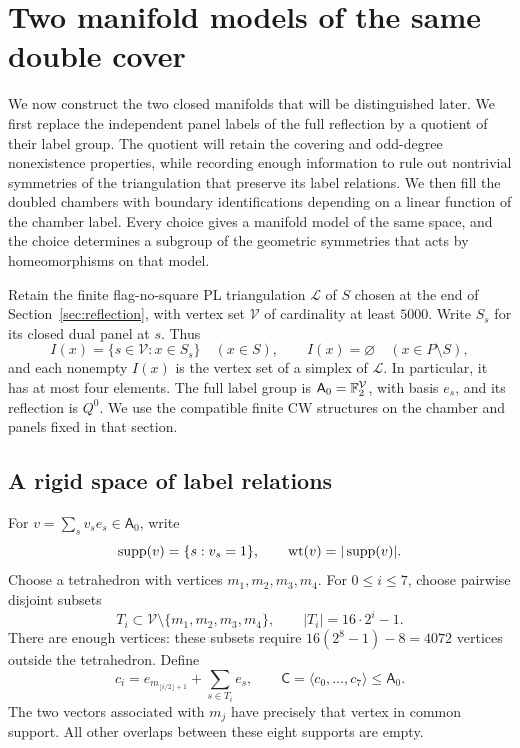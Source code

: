 \section{Two manifold models of the same double cover}
\label{mod:section}

We now construct the two closed manifolds that will be distinguished
later.  We first replace the independent panel labels of the full
reflection by a quotient of their label group.  The quotient will retain
the covering and odd-degree nonexistence properties, while recording
enough information to rule out nontrivial symmetries of the triangulation
that preserve its label relations.  We then fill the doubled chambers
with boundary identifications depending on a linear function of the
chamber label.  Every choice gives a manifold model of the same space,
and the choice determines a subgroup of the geometric symmetries that
acts by homeomorphisms on that model.

Retain the finite flag-no-square PL triangulation \(\mathcal L\) of \(S\) chosen
at the end of Section~\ref{sec:reflection}, with vertex set
\(\mathcal V\) of cardinality at least \(5000\).  Write \(S_s\) for its
closed dual panel at \(s\).  Thus
\[
 I(x)=\{s\in\mathcal V:x\in S_s\}\quad(x\in S),
 \qquad I(x)=\varnothing\quad(x\in P\setminus S),
\]
and each nonempty \(I(x)\) is the vertex set of a simplex of \(\mathcal L\).
In particular, it has at most four elements.  The full label group is
\(\mathsf A_0=\mathbb F_2^{\mathcal V}\), with basis \(e_s\), and its
reflection is \(Q^0\).  We use the compatible finite CW structures on
the chamber and panels fixed in that section.

\subsection{A rigid space of label relations}

For \(v=\sum_s v_s e_s\in\mathsf A_0\), write
\[
 \operatorname{supp}(v)=\{s:v_s=1\},\qquad \operatorname{wt}(v)=|\operatorname{supp}(v)|.
\]
Choose a tetrahedron with vertices \(m_1,m_2,m_3,m_4\).  For
\(0\leq i\leq7\), choose pairwise disjoint subsets
\[
 T_i\subset\mathcal V\setminus\{m_1,m_2,m_3,m_4\},
 \qquad |T_i|=16\cdot2^i-1.
\]
There are enough vertices: these subsets require
\(16(2^8-1)-8=4072\) vertices outside the tetrahedron.  Define
\begin{equation}\label{mod:relation-space}
 c_i=e_{m_{\lfloor i/2\rfloor+1}}+\sum_{s\in T_i}e_s,
 \qquad
 \mathsf C=\langle c_0,\ldots,c_7\rangle\leq\mathsf A_0.
\end{equation}
The two vectors associated with \(m_j\) have precisely that vertex in
common support.  All other overlaps between these eight supports are
empty.

